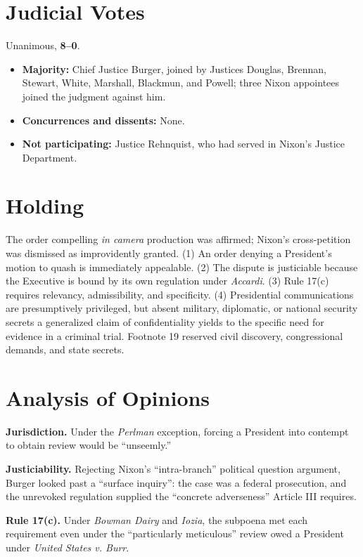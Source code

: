 \documentclass[12pt]{article}
\begin{document}
\section{Judicial Votes}

Unanimous, \textbf{8--0}.
\begin{itemize}
\item \textbf{Majority:} Chief Justice Burger, joined by Justices Douglas, Brennan, Stewart, White, Marshall, Blackmun, and Powell; three Nixon appointees joined the judgment against him.
\item \textbf{Concurrences and dissents:} None.
\item \textbf{Not participating:} Justice Rehnquist, who had served in Nixon's Justice Department.
\end{itemize}

\section{Holding}

The order compelling \textit{in camera} production was affirmed; Nixon's cross-petition was dismissed as improvidently granted. (1) An order denying a President's motion to quash is immediately appealable. (2) The dispute is justiciable because the Executive is bound by its own regulation under \textit{Accardi}. (3) Rule 17(c) requires relevancy, admissibility, and specificity. (4) Presidential communications are presumptively privileged, but absent military, diplomatic, or national security secrets a generalized claim of confidentiality yields to the specific need for evidence in a criminal trial. Footnote 19 reserved civil discovery, congressional demands, and state secrets.

\section{Analysis of Opinions}

\textbf{Jurisdiction.} Under the \textit{Perlman} exception, forcing a President into contempt to obtain review would be ``unseemly.''

\textbf{Justiciability.} Rejecting Nixon's ``intra-branch'' political question argument, Burger looked past a ``surface inquiry'': the case was a federal prosecution, and the unrevoked regulation supplied the ``concrete adverseness'' Article III requires.

\textbf{Rule 17(c).} Under \textit{Bowman Dairy} and \textit{Iozia}, the subpoena met each requirement even under the ``particularly meticulous'' review owed a President under \textit{United States v. Burr}.
\end{document}

